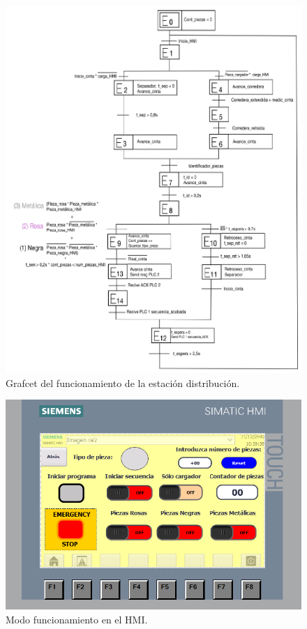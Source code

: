 \begin{figure} [h!]
  \begin{center}
    \includegraphics[width=15cm]{figs/grafcet_distribucion}
  \end{center}
  \caption{\centering Grafcet del funcionamiento de la estación distribución.}
  \label{fig:grafcet_distribucion}
\end{figure} 

\clearpage

\begin{figure} [h!]
  \begin{center}
    \includegraphics[width=15cm]{figs/HMI_funcionamiento}
  \end{center}
  \caption{\centering Modo funcionamiento en el HMI.}
  \label{fig:HMI_funcionamiento}
\end{figure} 

